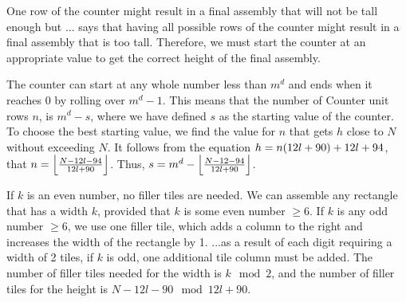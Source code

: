 %
One row of the counter might result in a final assembly that will not be tall enough but ... says that having all possible rows of the counter might result in a final assembly that is too tall.
%
Therefore, we must start the counter at an appropriate value to get the correct height of the final assembly.
%


%
The counter can start at any whole number less than $m^d$ and ends when it reaches 0 by rolling over $m^d - 1$.
%
This means that the number of Counter unit rows $n$, is $m^d - s$, where we have defined $s$ as the starting value of the counter.
%
To choose the best starting value, we find the value for $n$ that gets $h$ close to $N$ without exceeding $N$.
%
It follows from the equation $h = n(\rowheight) + \seedheight$, that $n = \floor*{\frac{N - 12l - 94}{\rowheight}}$.
%
Thus, $s = m^d - \floor*{\frac{N - 12 - 94}{\rowheight}}$.
%

%
If $k$ is an even number, no filler tiles are needed.
%
We can assemble any rectangle that has a width $k$, provided that $k$ is some even number $\geq 6$.
%
If $k$ is any odd number $\geq 6$, we use one filler tile, which adds a column to the right and increases the width of the rectangle by 1.
%
...as a result of each digit requiring a width of 2 tiles, if $k$ is odd, one additional tile column must be added.
%
The number of filler tiles needed for the width is $k \mod 2$, and the number of filler tiles for the height is $N - 12l - 90 \mod 12l + 90$.
%

